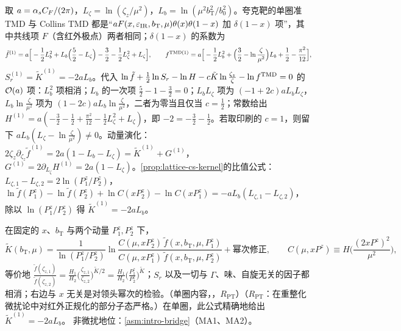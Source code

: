 \begin{example}\label{ex:lamet-qtmd-oneloop}
取 $a=\alpha_s C_F/(2\pi)$，$L_\zeta=\ln(\zeta_z/\mu^2)$，$L_b=\ln(\mu^2b_{\mathrm T}^2/b_0^2)$。夸克靶的单圈准 TMD 与 Collins TMD 都是“$aF(x,\varepsilon_{\rm IR},b_{\mathrm T},\mu)\theta(x)\theta(1-x)$ 加 $\delta(1-x)$ 项”，其中共线项 $F$（含红外极点）两者相同\cite{JiEtAl2021}；$\delta(1-x)$ 的系数为
\[
\tilde f^{(1)}=a\Big[-\frac12L_b^2+L_b\Big(\frac52-L_\zeta\Big)-\frac32-\frac12L_\zeta^2+L_\zeta\Big],\qquad
f^{{\rm TMD}(1)}=a\Big[-\frac12L_b^2+\Big(\frac32-\ln\frac\zeta{\mu^2}\Big)L_b+\frac12-\frac{\pi^2}{12}\Big],
\]%
$S_r^{(1)}=\tilde K^{(1)}=-2aL_b$。代入 $\ln\tilde f+\frac12\ln S_r-\ln H-c\tilde K\ln\frac{\zeta_z}\zeta-\ln f^{\rm TMD}=0$ 的 $\mathcal{O}\!\left(a\right)$ 项：$L_b^2$ 项相消；$L_b$ 的一次项 $\frac52-1-\frac32=0$；$L_bL_\zeta$ 项为 $(-1+2c)aL_bL_\zeta$，$L_b\ln\frac\zeta{\mu^2}$ 项为 $(1-2c)aL_b\ln\frac\zeta{\mu^2}$，二者为零当且仅当 $c=\frac12$；常数给出 $H^{(1)}=a(-\frac32-\frac12+\frac{\pi^2}{12}-\frac12L_\zeta^2+L_\zeta)$，即 $-2=-\frac32-\frac12$。若取印刷的 $c=1$，则留下 $aL_b(L_\zeta-\ln\frac\zeta{\mu^2})\neq0$。动量演化：$2\zeta_z\partial_{\zeta_z}\tilde f^{(1)}=2a(1-L_b-L_\zeta)=\tilde K^{(1)}+G^{(1)}$，$G^{(1)}=2\partial_{L_\zeta}H^{(1)}=2a(1-L_\zeta)$。\cref{prop:lattice-cs-kernel}的比值公式：$L_{\zeta,1}-L_{\zeta,2}=2\ln(P^z_1/P^z_2)$，$\ln\tilde f(P^z_1)-\ln\tilde f(P^z_2)+\ln C(xP^z_2)-\ln C(xP^z_1)=-aL_b(L_{\zeta,1}-L_{\zeta,2})$，除以 $\ln(P^z_1/P^z_2)$ 得 $\tilde K^{(1)}=-2aL_b$。
\end{example}

\begin{proposition}\label{prop:lattice-cs-kernel}
在固定的 $x$、$b_{\mathrm T}$ 与两个动量 $P_1^z,P_2^z$ 下，
\begin{equation}\label{eq:lamet-cs}
\tilde K(b_{\mathrm T},\mu)=\frac1{\ln(P_1^z/P_2^z)}\ln\frac{C(\mu,xP_2^z)\,\tilde f(x,b_{\mathrm T},\mu,P_1^z)}{C(\mu,xP_1^z)\,\tilde f(x,b_{\mathrm T},\mu,P_2^z)}+\text{幂次修正},\qquad C(\mu,xP^z)\equiv H\Big(\frac{(2xP^z)^2}{\mu^2}\Big),
\end{equation}%
等价地 $\frac{\tilde f(\zeta_{z,1})}{\tilde f(\zeta_{z,2})}=\frac{H_1}{H_2}\big(\frac{\zeta_{z,1}}{\zeta_{z,2}}\big)^{\tilde K/2}=\frac{H_1}{H_2}\big(\frac{P^z_1}{P^z_2}\big)^{\tilde K}$；$S_r$ 以及一切与 $\Gamma$、味、自旋无关的因子都相消；右边与 $x$ 无关是对领头幂次的检验。（单圈内容，\tagR，$R_{\mathrm{PT}}$）（$R_{\mathrm{PT}}$：在重整化微扰论中对红外正规化的部分子态严格。）在单圈，此公式精确地给出 $\tilde K^{(1)}=-2aL_b$。
非微扰地位：\cref{asm:intro-bridge}（MA1、MA2）。
\end{proposition}

